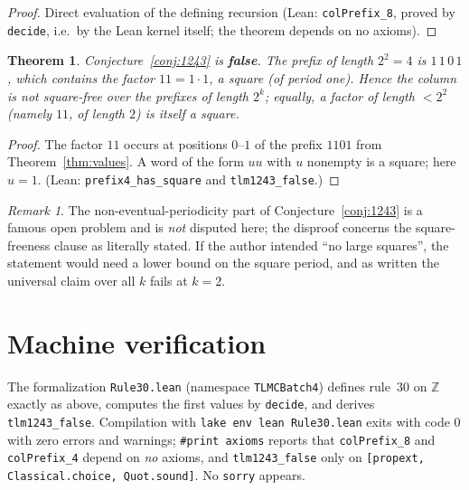 \documentclass[11pt]{article}
\newtheorem{theorem}{Theorem}[section]
\theoremstyle{definition}
\theoremstyle{remark}
\newtheorem*{remark}{Remark}
\begin{document}
\begin{proof}
Direct evaluation of the defining recursion (Lean: \texttt{colPrefix\_8}, proved by \texttt{decide}, i.e.\ by the Lean kernel itself; the theorem depends on no axioms).
\end{proof}

\begin{theorem}\label{thm:1243}
Conjecture~\ref{conj:1243} is \textbf{false}. The prefix of length $2^2 = 4$ is $1\,1\,0\,1$, which contains the factor $11 = 1 \cdot 1$, a square (of period one). Hence the column is not square-free over the prefixes of length $2^k$; equally, a factor of length $< 2^2$ (namely $11$, of length $2$) is itself a square.
\end{theorem}

\begin{proof}
The factor $11$ occurs at positions $0$--$1$ of the prefix $1101$ from Theorem~\ref{thm:values}. A word of the form $uu$ with $u$ nonempty is a square; here $u = 1$. (Lean: \texttt{prefix4\_has\_square} and \texttt{tlm1243\_false}.)
\end{proof}

\begin{remark}
The non-eventual-periodicity part of Conjecture~\ref{conj:1243} is a famous open problem and is \emph{not} disputed here; the disproof concerns the square-freeness clause as literally stated. If the author intended ``no large squares'', the statement would need a lower bound on the square period, and as written the universal claim over all $k$ fails at $k = 2$.
\end{remark}

\section{Machine verification}

The formalization \texttt{Rule30.lean} (namespace \texttt{TLMCBatch4}) defines rule~30 on $\mathbb{Z}$ exactly as above, computes the first values by \texttt{decide}, and derives \texttt{tlm1243\_false}. Compilation with \texttt{lake env lean Rule30.lean} exits with code $0$ with zero errors and warnings; \texttt{\#print axioms} reports that \texttt{colPrefix\_8} and \texttt{colPrefix\_4} depend on \emph{no} axioms, and \texttt{tlm1243\_false} only on \texttt{[propext, Classical.choice, Quot.sound]}. No \texttt{sorry} appears.
\end{document}
